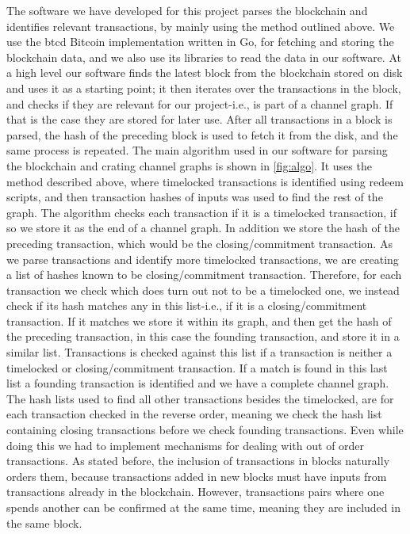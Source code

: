 The software we have developed for this project parses the blockchain and identifies relevant transactions, by mainly using the method outlined above.
We use the btcd \cite{btcd_roasbeef} Bitcoin implementation written in Go, for fetching and storing the blockchain data, and we also use its libraries to read the data in our software.
At a high level our software finds the latest block from the blockchain stored on disk and uses it as a starting point;
it then iterates over the transactions in the block, and checks if they are relevant for our project-i.e., is part of a channel graph. If that is the case they are stored for later use. After all transactions in a block is parsed, the hash of the preceding block is used to fetch it from the disk, and the same process is repeated.
The main algorithm used in our software for parsing the blockchain and crating channel graphs is shown in \cref{fig:algo}. It uses the method described above, where timelocked transactions is identified using redeem scripts, and then transaction hashes of inputs was used to find the rest of the graph.
The algorithm checks each transaction if it is a timelocked transaction, if so we store it as the end of a channel graph. In addition we store the hash of the preceding transaction, which would be the closing/commitment transaction. As we parse transactions and identify more timelocked transactions, we are creating a list of hashes known to be closing/commitment transaction. Therefore, for each transaction we check which does turn out not to be a timelocked one, we instead check if its hash matches any in this list-i.e., if it is a closing/commitment transaction. If it matches we store it within its graph, and then get the hash of the preceding transaction, in this case the founding transaction, and store it in a similar list. 
Transactions is checked against this list if a transaction is neither a timelocked or closing/commitment transaction.
If a match is found in this last list a founding transaction is identified and we have a complete channel graph. 
The hash lists used to find all other transactions besides the timelocked, are for each transaction checked in the reverse order, meaning we check the hash list containing closing transactions before we check founding transactions. Even while doing this we had to implement mechanisms for dealing with out of order transactions. As stated before, the inclusion of transactions in blocks naturally orders them, because 
transactions added in new blocks must have inputs from transactions already in the blockchain. However, transactions pairs where one spends another can be confirmed at the same time, meaning they are included in the same block.
